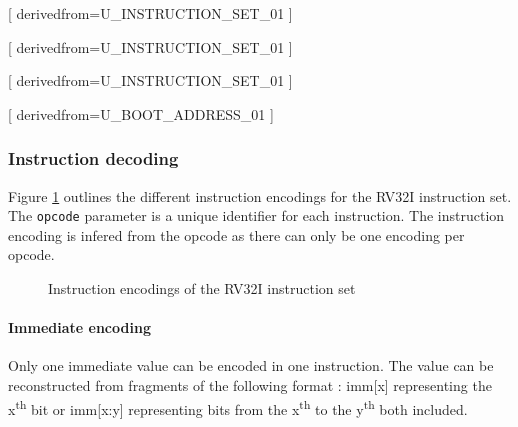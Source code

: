       [
          derivedfrom=U\_INSTRUCTION\_SET\_01
        ]

      [
          derivedfrom=U\_INSTRUCTION\_SET\_01
        ]

      [
          derivedfrom=U\_INSTRUCTION\_SET\_01
        ]

    [
        derivedfrom=U\_BOOT\_ADDRESS\_01
      ]

    \subsubsection{Instruction decoding}

      \begin{content}
          Figure \ref{fig:instructionencoding} outlines the different instruction encodings for the RV32I instruction set. The \texttt{opcode} parameter is a unique identifier for each instruction. The instruction encoding is infered from the opcode as there can only be one encoding per opcode.
        \end{content}

      \begin{figure}[h!]
          \centering
          
          \caption{Instruction encodings of the RV32I instruction set}
          \label{fig:instructionencoding}
        \end{figure}

      \paragraph{Immediate encoding}

      \begin{content}
          Only one immediate value can be encoded in one instruction. The value can be reconstructed from fragments of the following format : imm[x] representing the x\textsuperscript{th} bit or imm[x:y] representing bits from the x\textsuperscript{th} to the y\textsuperscript{th} both included.
        \end{content}


